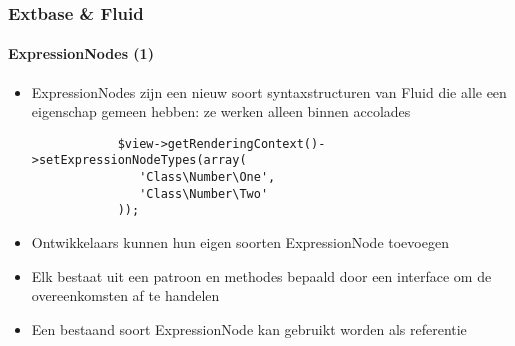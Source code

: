 
\begin{frame}[fragile]
	\frametitle{Extbase \& Fluid}
	\framesubtitle{ExpressionNodes (1)}

	\lstset{basicstyle=\smaller\ttfamily}

	\begin{itemize}

		\item ExpressionNodes zijn een nieuw soort syntaxstructuren van Fluid die alle
			een eigenschap gemeen hebben: ze werken alleen binnen accolades

		\begin{lstlisting}
			$view->getRenderingContext()->setExpressionNodeTypes(array(
			   'Class\Number\One',
			   'Class\Number\Two'
			));
		\end{lstlisting}

		\item Ontwikkelaars kunnen hun eigen soorten ExpressionNode toevoegen

		\item Elk bestaat uit een patroon en methodes bepaald door een interface om de overeenkomsten
			af te handelen

		\item Een bestaand soort ExpressionNode kan gebruikt worden als referentie

	\end{itemize}

\end{frame}


